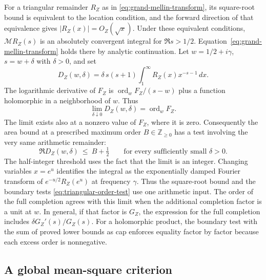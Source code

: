 \documentclass[11pt]{amsart}
\theoremstyle{definition}
\theoremstyle{remark}
\numberwithin{equation}{section}
\begin{document}
For a triangular remainder \(R_Z\) as in
\eqref{eq:grand-mellin-transform}, its square-root bound is equivalent
to the location condition, and the forward direction of that equivalence
gives \(|R_Z(x)|=O_Z(\sqrt{x})\). Under these equivalent conditions,
\(\mathcal{M}R_Z(s)\) is an absolutely convergent integral for
\(\Re s>1/2\). Equation~\eqref{eq:grand-mellin-transform} holds there by
analytic continuation. Let \(w=1/2+i\gamma\), \(s=w+\delta\) with
\(\delta>0\), and set
\[
 D_Z(w,\delta)=\delta\,s(s+1)
       \int_1^\infty R_Z(x)x^{-s-1}\,dx .
\]
The logarithmic derivative of \(F_Z\) is
\(\operatorname{ord}_w F_Z/(s-w)\) plus a function holomorphic in a
neighborhood of \(w\). Thus
\[
 \lim_{\delta\downarrow0}D_Z(w,\delta)=\operatorname{ord}_w F_Z.
\]
The limit exists also at a nonzero value of \(F_Z\), where it is zero.
Consequently the area bound at a prescribed maximum order
\(B\in\mathbb Z_{\ge0}\) has a test involving the very same arithmetic
remainder:
\begin{equation}
 \Re D_Z(w,\delta)\ \le\ B+\tfrac12
 \qquad\text{for every sufficiently small }\delta>0 .
 \label{eq:triangular-order-test}
\end{equation}
The half-integer threshold uses the fact that the limit is an integer.
Changing variables \(x=e^u\) identifies the integral as the exponentially
damped Fourier transform of \(e^{-u/2}R_Z(e^u)\) at frequency \(\gamma\).
Thus the square-root bound and the boundary tests
\eqref{eq:triangular-order-test} use one arithmetic input. The order of
the full completion agrees with this limit when the additional completion
factor is a unit at \(w\). In general, if that factor is \(G_Z\), the
expression for the full completion includes
\(\delta G_Z'(s)/G_Z(s)\). For a holomorphic product, the boundary
test with the sum of proved lower bounds as cap enforces equality
factor by factor because each excess order is nonnegative.

\subsection{A global mean-square criterion}
\end{document}
